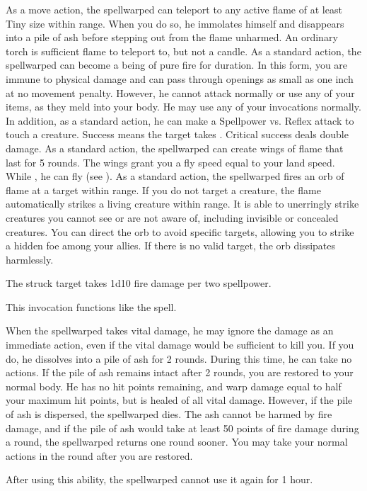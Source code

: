             As a move action, the spellwarped can teleport to any active flame of at least Tiny size within \rngmed range.
            When you do so, he immolates himself and disappears into a pile of ash before stepping out from the flame unharmed.
            An ordinary torch is sufficient flame to teleport to, but not a candle.
            As a standard action, the spellwarped can become a being of pure fire for \durshort duration.
            In this form, you are immune to physical damage and can pass through openings as small as one inch at no movement penalty.
            However, he cannot attack normally or use any of your items, as they meld into your body.
            He may use any of your invocations normally.
            In addition, as a standard action, he can make a Spellpower vs. Reflex attack to touch a creature.
            Success means the target takes .
            Critical success deals double damage.
            As a standard action, the spellwarped can create wings of flame that last for 5 rounds.
            The wings grant you a fly speed equal to your land speed.
            While \unencumbered, he can fly (see ).
            As a standard action, the spellwarped fires an orb of flame at a target within \rnglong range.
            If you do not target a creature, the flame automatically strikes a living creature within range.
            It is able to unerringly strike creatures you cannot see or are not aware of, including invisible or concealed creatures.
            You can direct the orb to avoid specific targets, allowing you to strike a hidden foe among your allies.
            If there is no valid target, the orb dissipates harmlessly.
            \par The struck target takes 1d10 fire damage per two spellpower.

            This invocation functions like the  spell.

            When the spellwarped takes vital damage, he may ignore the damage as an immediate action, even if the vital damage would be sufficient to kill you.
            If you do, he dissolves into a pile of ash for 2 rounds.
            During this time, he can take no actions.
            If the pile of ash remains intact after 2 rounds, you are restored to your normal body.
            He has no hit points remaining, and warp damage equal to half your maximum hit points, but is healed of all vital damage.
            However, if the pile of ash is dispersed, the spellwarped dies.
            The ash cannot be harmed by fire damage, and if the pile of ash would take at least 50 points of fire damage during a round, the spellwarped returns one round sooner.
            You may take your normal actions in the round after you are restored.
            \par After using this ability, the spellwarped cannot use it again for 1 hour.

